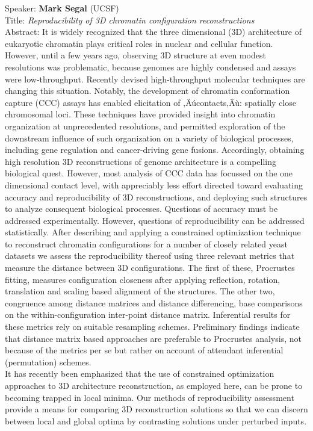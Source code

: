 \documentclass[11pt]{article}
\begin{document}
\bigskip
\noindent
Speaker: {\bf Mark Segal} (UCSF)\\
Title: {\it Reproducibility of 3D chromatin configuration reconstructions}\\
Abstract: It is widely recognized that the three dimensional (3D)
architecture of eukaryotic chromatin plays critical roles in nuclear
and cellular function.  However, until a few years ago, observing 3D
structure at even modest resolutions was problematic, because genomes
are highly condensed and assays were low-throughput.  Recently devised
high-throughput molecular techniques are changing this
situation. Notably, the development of chromatin conformation capture
(CCC) assays has enabled elicitation of ‚Äúcontacts‚Äù: spatially
close chromosomal loci. These techniques have provided insight into
chromatin organization at unprecedented resolutions, and permitted
exploration of the downstream influence of such organization on a
variety of biological processes, including gene regulation and
cancer-driving gene fusions. Accordingly, obtaining high resolution 3D
reconstructions of genome architecture is a compelling biological
quest. However, most analysis of CCC data has focussed on the one
dimensional contact level, with appreciably less effort directed
toward evaluating accuracy and reproducibility of 3D reconstructions,
and deploying such structures to analyze consequent biological
processes.  Questions of accuracy must be addressed experimentally.
However, questions of reproducibility can be addressed statistically.
After describing and applying a constrained optimization technique to
reconstruct chromatin configurations for a number of closely related
yeast datasets we assess the reproducibility thereof using three
relevant metrics that measure the distance between 3D configurations.
The first of these, Procrustes fitting, measures configuration
closeness after applying reflection, rotation, translation and scaling
based alignment of the structures.  The other two, congruence among
distance matrices and distance differencing, base comparisons on the
within-configuration inter-point distance matrix.  Inferential results
for these metrics rely on suitable resampling schemes.  Preliminary
findings indicate that distance matrix based approaches are preferable
to Procrustes analysis, not because of the metrics per se but rather
on account of attendant inferential (permutation) schemes.\\ 

\noindent It has recently been emphasized that the use of constrained
optimization approaches to 3D architecture reconstruction, as employed
here, can be prone to becoming trapped in local minima.  Our methods
of reproducibility assessment provide a means for comparing 3D
reconstruction solutions so that we can discern between local and
global optima by contrasting solutions under perturbed inputs.
\end{document}
